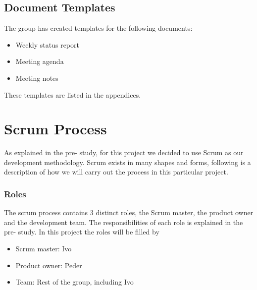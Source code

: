 \subsection{Document Templates}
The group has created templates for the following documents:

\begin{itemize}
\item Weekly status report
\item Meeting agenda
\item Meeting notes
\end{itemize}

These templates are listed in the appendices.

\section{Scrum Process}
As explained in the pre- study, for this project we decided to use Scrum as our development methodology.  Scrum exists in many shapes and forms, following is a description of how we will carry out the process in this particular project.

\subsubsection{Roles}
The scrum process contains 3 distinct roles, the Scrum master, the product owner and the development team. The responsibilities of each role is explained in the pre- study. In this project the roles will be filled by
\begin{itemize}
\item Scrum master: Ivo
\item Product owner: Peder
\item Team: Rest of the group, including Ivo
\end{itemize}

